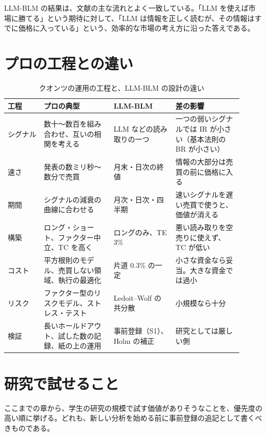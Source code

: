 LLM-BLM の結果は、文献の主な流れとよく一致している。「LLM を使えば市場に勝てる」という期待に対して、「LLM は情報を正しく読むが、その情報はすでに価格に入っている」という、効率的な市場の考え方に沿った答えである。

\section{プロの工程との違い}

\begin{table}[H]
\centering\small
\caption{クオンツの運用の工程と、LLM-BLM の設計の違い}
\label{tab:gap}
\begin{tabular}{@{}P{0.14\linewidth}P{0.27\linewidth}P{0.24\linewidth}P{0.26\linewidth}@{}}
\toprule
工程 & プロの典型 & LLM-BLM & 差の影響 \\
\midrule
シグナル & 数十〜数百を組み合わせ、互いの相関を考える & LLM などの読み取りの一つ & 一つの弱いシグナルでは IR が小さい（基本法則の BR が小さい） \\
速さ & 発表の数ミリ秒〜数分で売買 & 月末・日次の終値 & 情報の大部分は売買の前に価格に入る \\
期間 & シグナルの減衰の曲線に合わせる & 月次・日次・四半期 & 速いシグナルを遅い売買で使うと、価値が消える \\
構築 & ロング・ショート、ファクター中立、TC を高く & ロングのみ、TE 3\% & 悪い読み取りを空売りに使えず、TC が低い \\
コスト & 平方根則のモデル、売買しない領域、執行の最適化 & 片道 0.3\% の一定 & 小さな資金なら妥当。大きな資金では過小 \\
リスク & ファクター型のリスクモデル、ストレス・テスト & Ledoit--Wolf の共分散 & 小規模なら十分 \\
検証 & 長いホールドアウト、試した数の記録、紙の上の運用 & 事前登録（S1）、Holm の補正 & 研究としては厳しい側 \\
\bottomrule
\end{tabular}
\end{table}

\section{研究で試せること}

ここまでの章から、学生の研究の規模で試す価値がありそうなことを、優先度の高い順に挙げる。どれも、新しい分析を始める前に事前登録の追記として書くべきものである。

